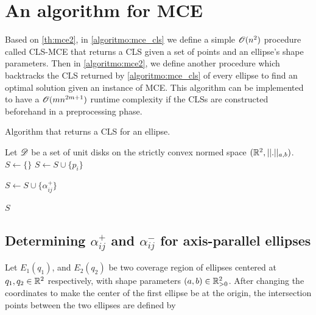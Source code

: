 \section{An algorithm for MCE}

Based on \autoref{th:mce2}, in \autoref{algoritmo:mce_cls} we define a simple $\mathscr{O}(n^2)$ procedure called CLS-MCE that returns a CLS given a set of points and an ellipse's shape parameters.
Then in \autoref{algoritmo:mce2}, we define another procedure which backtracks the CLS returned by \autoref{algoritmo:mce_cls} of every ellipse to find an optimal solution given an instance of MCE. This algorithm can be implemented to have a $\mathscr{O}(mn^{2m+1})$ runtime complexity if the CLSs are constructed beforehand in a preprocessing phase. 



\begin{algoritmo}
	\caption{Algorithm that returns a CLS for an ellipse.}\label{algoritmo:mce_cls}
	\begin{algorithmic}[1]
		
		\item[]
		
		\State Let $\mathscr{D}$ be a set of unit disks on the strictly convex normed space $(\mathbb{R}^2, ||.||_{a, b})$.
		\State $S \gets \{\}$
		\State $S \gets S \cup \{p_i\}$
		

		\State $S \gets S \cup \{\alpha_{ij}^+\}$	

		\EndFor
		\EndFor
		
		\State \Return $S$
		\EndProcedure
	\end{algorithmic}
\end{algoritmo}

\subsection{Determining $\alpha_{ij}^+$ and $\alpha_{ij}^-$ for axis-parallel ellipses}\label{section:ellipses_intersection2}

Let $E_1(q_1)$, and $E_2(q_2)$ be two coverage region of ellipses centered at $q_1, q_2\in\mathbb{R}^2$ respectively, with shape parameters $(a, b)\in\mathbb{R}^2_{>0}$. After changing the coordinates to make the center of the first ellipse be at the origin, the intersection points between the two ellipses are defined by

